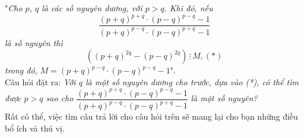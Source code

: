 \begin{bt}
{\begin{nx}
\begin{itemize}
				"\textit{Cho $p$, $q$ là các số nguyên dương, với $p>q$. Khi đó, nếu} $$\dfrac{(p+q)^{p+q} \cdot (p-q)^{p-q} - 1}{(p+q)^{p-q} \cdot (p-q)^{p+q} - 1}$$ \textit{là số nguyên thì } $$\left((p+q)^{2q} - (p-q)^{2q} \right) \, \vdots \, M, \text{} (*)$$ \textit{trong đó,} $M = (p+q)^{p-q} \cdot (p-q)^{p-q} - 1$". \\
				Câu hỏi đặt ra: \textit{Với $q$ là một số nguyên dương cho trước, dựa vào (*), có thể tìm được $p>q$ sao cho} $\dfrac{(p+q)^{p+q} \cdot (p-q)^{p-q} - 1}{(p+q)^{p-q} \cdot (p-q)^{p+q}-1}$ \textit{là một số nguyên?}\\
				Rất có thể, việc tìm câu trả lời cho câu hỏi trên sẽ mang lại cho bạn những điều bổ ích và thú vị.
			\end{itemize}
		\end{nx}
	}
\end{bt}
